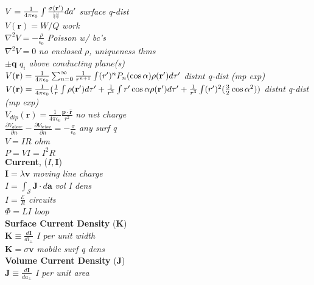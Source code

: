 \documentclass[9pt]{extarticle}
\def\rcurs{{\mbox{$\resizebox{.09in}{.08in}{\texttt{[image: ScriptR]}}$}}}
\begin{document}
\begin{multicols}{3}
$V = \frac{1}{4\pi\epsilon_{0}}\int\frac{\sigma(\mathbf{r'})}{\rcurs}da'$ \textit{surface q-dist} \\
$V(\mathbf{r}) = W/Q$ \textit{work} \\
$\nabla^{2}V = -\frac{\rho}{\epsilon_{0}}$ \textit{Poisson w/ bc's} \\
$\nabla^{2}V = 0$ \textit{no enclosed $\rho$, uniqueness thms} \\
$\pm\mathbf{q}$  \textit{$q_{i}$ above conducting plane(s)} \\
$V(\mathbf{r}) = \frac{1}{4\pi\epsilon_{0}}\sum_{n=0}^{\infty}\frac{1}{r^{n+1}}\\\int(r')^{n}P_{n}(\cos{\alpha})\rho(\mathbf{r'})d\tau'$ \textit{distnt q-dist (mp exp)} \\
$V(\mathbf{r}) = \frac{1}{4\pi\epsilon_{0}} (\frac{1}{r}\int\rho(\mathbf{r'})d\tau' \\ + \frac{1}{r^{2}}\int r'\cos{\alpha}\rho(\mathbf{r'})d\tau' \\ + \frac{1}{r^{3}}\int(r')^{2}(\frac{3}{2}\cos{\alpha}^{2}))$  \textit{distnt q-dist (mp exp)} \\
$V_{dip}(\mathbf{r}) = \frac{1}{4\pi\epsilon_{0}}\frac{\mathbf{p}\cdot\mathbf{\hat{r}}}{r^{2}}$  \textit{no net charge} \\
$\frac{\partial V_{above}}{\partial n} - \frac{\partial V_{below}}{\partial n} = -\frac{\sigma}{\epsilon_{0}}$ \textit{any surf q} \\
$V=IR$ \textit{ohm} \\
$P = VI =  I^{2}R$  \\
\textbf{Current}, ($I, \mathbf{I}$) \\
$\mathbf{I} = \lambda\mathbf{v}$ \textit{moving line charge} \\
$I = \int_{\mathcal{S}} \mathbf{J}\cdot d\mathbf{a}$ \textit{vol I dens} \\
$I = \frac{\mathcal{E}}{R}$ \textit{circuits} \\
$\Phi = LI$ \textit{loop} \\
\textbf{Surface Current Density} ($\mathbf{K}$) \\
$\mathbf{K} \equiv \frac{d\mathbf{I}}{dl_{\perp}}$ \textit{I per unit width} \\
$\mathbf{K} = \sigma\mathbf{v}$ \textit{mobile surf q dens} \\
\textbf{Volume Current Density} ($\mathbf{J}$) \\
$\mathbf{J} \equiv \frac{d\mathbf{I}}{da_{\perp}}$ \textit{I per unit area} \\

\end{multicols}
\end{document}
